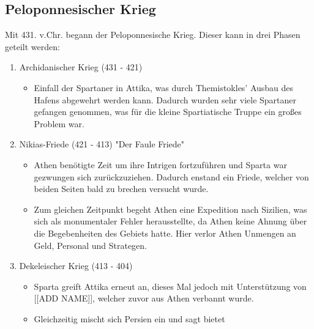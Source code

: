 \documentclass{article}
\begin{document}
	\subsection{Peloponnesischer Krieg}
	Mit 431. v.Chr. begann der Peloponnesische Krieg. Dieser kann in drei Phasen geteilt werden:
	\begin{enumerate}
		\item{Archidanischer Krieg (431 - 421)}
		\begin{itemize}
			\item{Einfall der Spartaner in Attika, was durch Themistokles' Ausbau des Hafens abgewehrt werden kann. Dadurch wurden sehr viele Spartaner gefangen genommen, was für die kleine Spartiatische Truppe ein großes Problem war.}
		\end{itemize}
		\item{Nikias-Friede (421 - 413) "Der Faule Friede"}
		\begin{itemize}
			\item{Athen benötigte Zeit um ihre Intrigen fortzuführen und Sparta war gezwungen sich zurückzuziehen. Dadurch enstand ein Friede, welcher von beiden Seiten bald zu brechen versucht wurde.}
			\item{Zum gleichen Zeitpunkt begeht Athen eine Expedition nach Sizilien, was sich als monumentaler Fehler herausstellte, da Athen keine Ahnung über die Begebenheiten des Gebiets hatte. Hier verlor Athen Unmengen an Geld, Personal und Strategen.}
		\end{itemize}
		\item{Dekeleischer Krieg (413 - 404)}
		\begin{itemize}
			\item{Sparta greift Attika erneut an, dieses Mal jedoch mit Unterstützung von [[ADD NAME]], welcher zuvor aus Athen verbannt wurde.}
			\item{Gleichzeitig mischt sich Persien ein und sagt bietet }
		\end{itemize}
	\end{enumerate}
\end{document}
